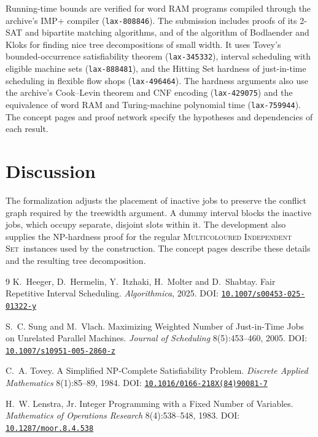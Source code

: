 \documentclass[11pt,a4paper]{article}
\theoremstyle{definition}
\newcommand{\doi}[1]{DOI: \href{https://doi.org/#1}{\nolinkurl{#1}}}
\newcommand{\MCIS}{\textsc{Multicoloured Independent Set}}
\begin{document}
Running-time bounds are verified for word RAM programs compiled through the archive's
IMP+ compiler (\texttt{lax-808846}). The submission includes proofs of its 2-SAT
and bipartite matching algorithms, and of the algorithm of Bodlaender and Kloks for finding
nice tree decompositions of small width. It uses Tovey's bounded-occurrence satisfiability theorem
(\texttt{lax-345332}), interval scheduling with eligible machine sets
(\texttt{lax-888481}), and the Hitting Set hardness of just-in-time scheduling in
flexible flow shops (\texttt{lax-496464}). The hardness arguments also use the archive's Cook--Levin
theorem and CNF encoding (\texttt{lax-429075}) and the equivalence of word RAM
and Turing-machine polynomial time (\texttt{lax-759944}). The concept pages and
proof network specify the hypotheses and dependencies of each result.

\section{Discussion}

The formalization adjusts the placement of inactive jobs to preserve the conflict
graph required by the treewidth argument. A dummy interval blocks the inactive jobs,
which occupy separate, disjoint slots within it. The development also supplies the
NP-hardness proof for the regular \MCIS\ instances used by the construction.
The concept pages describe these details and the resulting tree decomposition.

\begin{thebibliography}{9}
K.~Heeger, D.~Hermelin, Y.~Itzhaki, H.~Molter and D.~Shabtay.
\newblock Fair Repetitive Interval Scheduling.
\newblock \emph{Algorithmica}, 2025.
\newblock \doi{10.1007/s00453-025-01322-y}

S.~C. Sung and M.~Vlach.
\newblock Maximizing Weighted Number of Just-in-Time Jobs on Unrelated Parallel Machines.
\newblock \emph{Journal of Scheduling} 8(5):453--460, 2005.
\newblock \doi{10.1007/s10951-005-2860-z}

C.~A. Tovey.
\newblock A Simplified NP-Complete Satisfiability Problem.
\newblock \emph{Discrete Applied Mathematics} 8(1):85--89, 1984.
\newblock \doi{10.1016/0166-218X(84)90081-7}

H.~W. Lenstra, Jr.
\newblock Integer Programming with a Fixed Number of Variables.
\newblock \emph{Mathematics of Operations Research} 8(4):538--548, 1983.
\newblock \doi{10.1287/moor.8.4.538}
\end{thebibliography}
\end{document}
